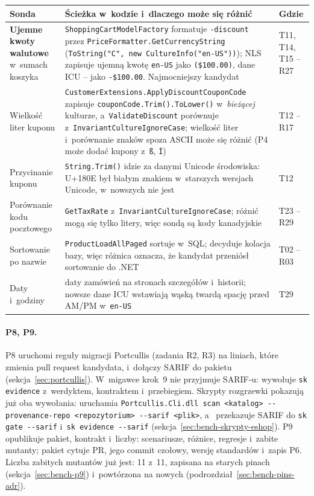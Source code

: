 \begin{center}
\small
\begin{tabularx}{\linewidth}{@{}>{\raggedright\arraybackslash}p{2.8cm} >{\raggedright\arraybackslash}X >{\raggedright\arraybackslash}p{1.9cm}@{}}
\toprule
Sonda & Ścieżka w~kodzie i~dlaczego może się różnić & Gdzie \\
\midrule
\textbf{Ujemne kwoty walutowe} w~sumach koszyka & \texttt{ShoppingCartModelFactory}
  formatuje \texttt{-discount} przez \texttt{PriceFormatter.GetCurrencyString}
  (\texttt{ToString("C", new CultureInfo("en-US"))}); NLS zapisuje ujemną kwotę
  \texttt{en-US} jako \texttt{(\$100.00)}, dane ICU -- jako \texttt{-\$100.00}.
  Najmocniejszy kandydat & T11, T14, T15 -- R27 \\
Wielkość liter kuponu & \texttt{CustomerExtensions.ApplyDiscountCouponCode} zapisuje
  \texttt{couponCode.Trim().ToLower()} w~\emph{bieżącej} kulturze, a~\texttt{ValidateDiscount}
  porównuje z~\texttt{InvariantCultureIgnoreCase}; wielkość liter i~porównanie znaków spoza
  ASCII może się różnić (P4 może dodać kupony z~\texttt{ß}, \texttt{İ}) & T12 -- R17 \\
Przycinanie kuponu & \texttt{String.Trim()} idzie za danymi Unicode środowiska: U+180E był
  białym znakiem w~starszych wersjach Unicode, w~nowszych nie jest & T12 \\
Porównanie kodu pocztowego & \texttt{GetTaxRate} z~\texttt{InvariantCultureIgnoreCase};
  różnić mogą się tylko litery, więc sondą są kody kanadyjskie & T23 -- R29 \\
Sortowanie po nazwie & \texttt{ProductLoadAllPaged} sortuje w~SQL; decyduje kolacja bazy,
  więc różnica oznacza, że kandydat przeniósł sortowanie do .NET & T02 -- R03 \\
Daty i~godziny & daty zamówień na stronach szczegółów i~historii; nowsze dane ICU wstawiają
  wąską twardą spację przed AM/PM w~\texttt{en-US} & T29 \\
\bottomrule
\end{tabularx}
\end{center}

\paragraph{P8, P9.} P8 uruchomi reguły migracji Portcullis (zadania R2, R3) na liniach,
które zmienia pull request kandydata, i~dołączy SARIF do pakietu
(sekcja~\ref{sec:portcullis}). W~migawce krok~9 nie przyjmuje SARIF-u: wywołuje
\texttt{sk evidence} z~werdyktem, kontraktem i~przebiegiem. Skrypty rozgrzewki pokazują już
oba wywołania:  uruchamia \texttt{Portcullis.Cli.dll scan <katalog>
-{}-provenance-repo <repozytorium> -{}-sarif <plik>}, a~ przekazuje
SARIF do \texttt{sk gate -{}-sarif} i~\texttt{sk evidence -{}-sarif}
(sekcja~\ref{sec:bench-skrypty-eshop}). P9 opublikuje pakiet, kontrakt i~liczby: scenariusze,
różnice, regresje i~zabite mutanty; pakiet cytuje PR, jego commit czołowy, wersję
standardów i~zapis P6. Liczba zabitych mutantów już jest: 11 z~11, zapisana na starych pinach
(sekcja~\ref{sec:bench-p9}) i~powtórzona na nowych (podrozdział~\ref{sec:bench-pins-adr}).

